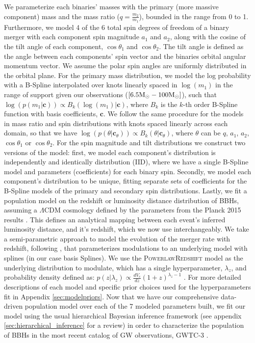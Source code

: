 We parameterize each binaries' masses with the primary (more massive component) mass 
and the mass ratio ($q=\frac{m_2}{m_1}$), bounded in the range from 0 to 1. Furthermore, we model 4 of the 6 total 
spin degrees of freedom of a binary merger with each component spin magnitude $a_1$ and $a_2$, along with the cosine of the tilt angle of each component, 
$\cos{\theta_1}$ and $\cos{\theta_2}$. The tilt angle is defined as the angle between each components' spin vector and the binaries orbital angular momentum vector. 
We assume the polar spin angles are uniformly distributed in the orbital plane. For the primary mass distribution, we model the log probability with a B-Spline interpolated over 
knots linearly spaced in $\log(m_1)$ in the range of support given our observations ($[6.5{\rm M}_\odot-100{\rm M}_\odot]$), such that $\log(p(m_1 | \bm{c})) \propto B_{k}(\log(m_1) | \bm{c})$, where $B_{k}$ is the 
$k$-th order B-Spline function with basis coefficients, $\bm{c}$. We follow the same procedure for the models in mass ratio and spin distributions with knots spaced linearly across each domain, 
so that we have $\log(p(\theta | \bm{c}_\theta)) \propto B_{k}(\theta | \bm{c}_\theta)$, where $\theta$ can be $q$, $a_1$, $a_2$, $\cos{\theta_1}$ or $\cos{\theta_2}$. 
For the spin magnitude and tilt distributions we construct two versions of the model: first, we model  
each component's distribution is independently and identically distribution (IID), where we have a single B-Spline model and parameters (coefficients) for each binary spin. 
Secondly, we model each component's distribution to be unique, fitting separate sets of coefficients for the B-Spline models of the primary and secondary spin distributions. 
Lastly, we fit a population model on the redshift or luminosity distance distribution of BBHs, assuming a $\Lambda\mathrm{CDM}$ cosmology defined by the parameters 
from the Planck 2015 results \citep{Planck2015}. This defines an analytical mapping between each event's inferred luminosity distance, and it's redshift, which we now use interchangeably. 
We take a semi-parametric approach to model the evolution of the merger rate with redshift, following \citet{Edelman_2022ApJ}, that parameterizes modulations to an underlying model 
with splines (in our case basis Splines). We use the \textsc{PowerlawRedshift} model as the underlying distribution to modulate, which has a single hyperparameter, $\lambda_z$, and 
probability density defined as: $p(z|\lambda_z)\propto \frac{dV_c}{dz}(1+z)^{\lambda_z-1}$ \citep{Fishbach_2018redshift}. For more detailed descriptions of each model and 
specific prior choices used for the hyperparameters fit in Appendix \ref{sec:modelpriors}. Now that we have our comprehensive data-driven population model over 
each of the 7 modeled parameters built, we fit our model using the usual hierarchical Bayesian inference framework (see appendix \ref{sec:hierarchical_inference} for a review) in order to characterize 
the population of BBHs in the most recent catalog of GW observations, GWTC-3 \citep{GWTC3,o3b_astro_dist}. 
